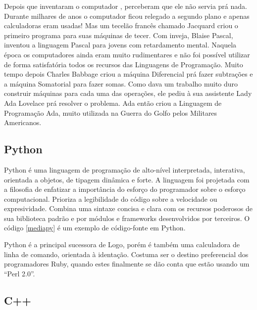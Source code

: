 Depois que inventaram o computador , perceberam que ele não servia prá nada. Durante milhares de anos o computador ficou relegado a segundo plano e apenas calculadoras eram usadas! Mas um tecelão francês chamado Jacquard criou o primeiro programa para suas máquinas de tecer. Com inveja, Blaise Pascal, inventou a linguagem Pascal para jovens com retardamento mental. Naquela época os computadores ainda eram muito rudimentares e não foi possível utilizar de forma satisfatória todos os recursos das Linguagens de Programação. Muito tempo depois Charles Babbage criou a máquina Diferencial prá fazer subtrações e a máquina Somatorial para fazer somas. Como dava um trabalho muito duro construir máquinas para cada uma das operações, ele pediu à sua assistente Lady Ada Lovelace prá resolver o problema. Ada então criou a Linguagem de Programação Ada, muito utilizada na Guerra do Golfo pelos Militares Americanos.

\subsection{Python}

Python é uma linguagem de programação de alto-nível interpretada, interativa, orientada a objetos, de tipagem dinâmica e forte. A linguagem foi projetada com a filosofia de enfatizar a importância do esforço do programador sobre o esforço computacional. Prioriza a legibilidade do código sobre a velocidade ou expresividade. Combina uma sintaxe concisa e clara com os recursos poderosos de sua biblioteca padrão e por módulos e frameworks desenvolvidos por terceiros. O código \ref{mediapy} é um exemplo de código-fonte em Python.



Python é a principal sucessora de Logo, porém é também uma calculadora de linha de comando, orientada à identação. Costuma ser o destino preferencial dos programadores Ruby, quando estes finalmente se dão conta que estão usando um ``Perl 2.0''. 

\subsection{C++}

